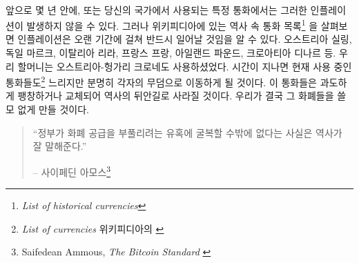 \paragraph{}
앞으로 몇 년 안에, 또는 당신의 국가에서 사용되는 특정 통화에서는 그러한 인플레이션이 발생하지 않을 수 있다. 
그러나 위키피디아에 있는 역사 속 통화 목록\footnote{\textit{List of historical currencies}\cite{wiki:historical-currencies}}
을 살펴보면 인플레이션은 오랜 기간에 걸쳐 반드시 일어날 것임을 알 수 있다.
오스트리아 실링, 독일 마르크, 이탈리아 리라, 프랑스 프랑, 아일랜드 파운드, 크로아티아 디나르 등.
우리 할머니는 오스트리아-헝가리 크로네도 사용하셨었다. 
시간이 지나면 현재 사용 중인 통화들도\footnote{\textit{List of currencies} 위키피디아의 \cite{wiki:list-of-currencies}}
느리지만 분명히 각자의 무덤으로 이동하게 될 것이다.
이 통화들은 과도하게 팽창하거나 교체되어 역사의 뒤안길로 사라질 것이다.
우리가 결국 그 화폐들을 쓸모 없게 만들 것이다.

\begin{quotation}\begin{samepage}
		\enquote{정부가 화폐 공급을 부풀리려는 유혹에 굴복할 수밖에 없다는 사실은 역사가 잘 말해준다.}
		\begin{flushright} -- 사이페딘 아모스\footnote{Saifedean Ammous, \textit{The Bitcoin
					Standard} \cite{bitcoin-standard}}
\end{flushright}\end{samepage}\end{quotation}


